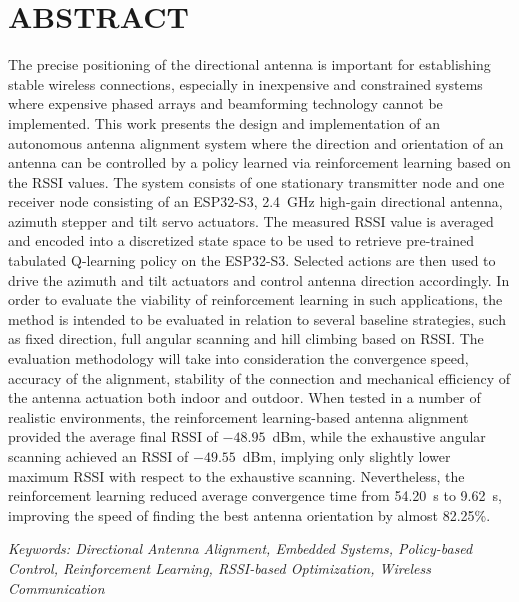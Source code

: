 \newpage
\section*{ABSTRACT}  
{}

The precise positioning of the directional antenna is important for establishing stable wireless connections, especially in inexpensive and constrained systems where expensive phased arrays and beamforming technology cannot be implemented. This work presents the design and implementation of an autonomous antenna alignment system where the direction and orientation of an antenna can be controlled by a policy learned via reinforcement learning based on the RSSI values. The system consists of one stationary transmitter node and one receiver node consisting of an ESP32-S3, 2.4~GHz  high-gain directional antenna, azimuth stepper and tilt servo actuators. The measured RSSI value is averaged and encoded into a discretized state space to be used to retrieve pre-trained tabulated Q-learning policy on the ESP32-S3. Selected actions are then used to drive the azimuth and tilt actuators and control antenna direction accordingly. In order to evaluate the viability of reinforcement learning in such applications, the method is intended to be evaluated in relation to several baseline strategies, such as fixed direction, full angular scanning and hill climbing based on RSSI. The evaluation methodology will take into consideration the convergence speed, accuracy of the alignment, stability of the connection and mechanical efficiency of the antenna actuation both indoor and outdoor. When tested in a number of realistic environments, the reinforcement learning-based antenna alignment provided the average final RSSI of $-48.95$~dBm, while the exhaustive angular scanning achieved an RSSI of $-49.55$~dBm, implying only slightly lower maximum RSSI with respect to the exhaustive scanning. Nevertheless, the reinforcement learning reduced average convergence time from 54.20~s to 9.62~s, improving the speed of finding the best antenna orientation by almost 82.25\%.

\vspace{0.5cm}

\textit{Keywords: Directional Antenna Alignment, Embedded Systems, Policy-based Control, Reinforcement Learning, RSSI-based Optimization, Wireless Communication}
